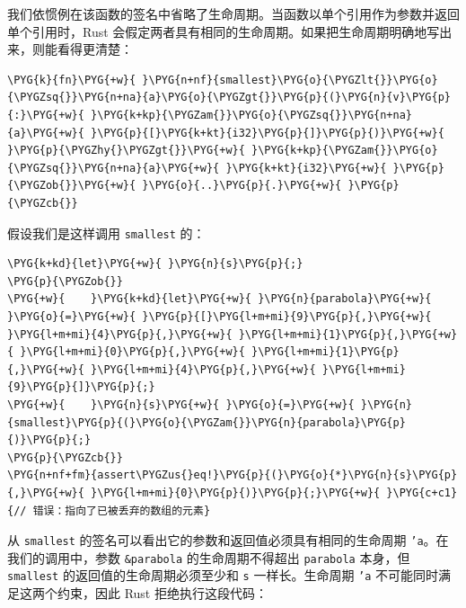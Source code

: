 我们依惯例在该函数的签名中省略了生命周期。当函数以单个引用作为参数并返回单个引用时，Rust 会假定两者具有相同的生命周期。如果把生命周期明确地写出来，则能看得更清楚：

\begin{Verbatim}[commandchars=\\\{\},breaklines=true,breakanywhere=true,fontsize=\codefont,xleftmargin=17bp]
\PYG{k}{fn}\PYG{+w}{ }\PYG{n+nf}{smallest}\PYG{o}{\PYGZlt{}}\PYG{o}{\PYGZsq{}}\PYG{n+na}{a}\PYG{o}{\PYGZgt{}}\PYG{p}{(}\PYG{n}{v}\PYG{p}{:}\PYG{+w}{ }\PYG{k+kp}{\PYGZam{}}\PYG{o}{\PYGZsq{}}\PYG{n+na}{a}\PYG{+w}{ }\PYG{p}{[}\PYG{k+kt}{i32}\PYG{p}{]}\PYG{p}{)}\PYG{+w}{ }\PYG{p}{\PYGZhy{}\PYGZgt{}}\PYG{+w}{ }\PYG{k+kp}{\PYGZam{}}\PYG{o}{\PYGZsq{}}\PYG{n+na}{a}\PYG{+w}{ }\PYG{k+kt}{i32}\PYG{+w}{ }\PYG{p}{\PYGZob{}}\PYG{+w}{ }\PYG{o}{..}\PYG{p}{.}\PYG{+w}{ }\PYG{p}{\PYGZcb{}}
\end{Verbatim}

假设我们是这样调用 \texttt{smallest} 的：

\begin{Verbatim}[commandchars=\\\{\},breaklines=true,breakanywhere=true,fontsize=\codefont,xleftmargin=17bp]
\PYG{k+kd}{let}\PYG{+w}{ }\PYG{n}{s}\PYG{p}{;}
\PYG{p}{\PYGZob{}}
\PYG{+w}{    }\PYG{k+kd}{let}\PYG{+w}{ }\PYG{n}{parabola}\PYG{+w}{ }\PYG{o}{=}\PYG{+w}{ }\PYG{p}{[}\PYG{l+m+mi}{9}\PYG{p}{,}\PYG{+w}{ }\PYG{l+m+mi}{4}\PYG{p}{,}\PYG{+w}{ }\PYG{l+m+mi}{1}\PYG{p}{,}\PYG{+w}{ }\PYG{l+m+mi}{0}\PYG{p}{,}\PYG{+w}{ }\PYG{l+m+mi}{1}\PYG{p}{,}\PYG{+w}{ }\PYG{l+m+mi}{4}\PYG{p}{,}\PYG{+w}{ }\PYG{l+m+mi}{9}\PYG{p}{]}\PYG{p}{;}
\PYG{+w}{    }\PYG{n}{s}\PYG{+w}{ }\PYG{o}{=}\PYG{+w}{ }\PYG{n}{smallest}\PYG{p}{(}\PYG{o}{\PYGZam{}}\PYG{n}{parabola}\PYG{p}{)}\PYG{p}{;}
\PYG{p}{\PYGZcb{}}
\PYG{n+nf+fm}{assert\PYGZus{}eq!}\PYG{p}{(}\PYG{o}{*}\PYG{n}{s}\PYG{p}{,}\PYG{+w}{ }\PYG{l+m+mi}{0}\PYG{p}{)}\PYG{p}{;}\PYG{+w}{ }\PYG{c+c1}{// 错误：指向了已被丢弃的数组的元素}
\end{Verbatim}

从 \texttt{smallest} 的签名可以看出它的参数和返回值必须具有相同的生命周期 \texttt{'a}。在我们的调用中，参数 \texttt{\&parabola} 的生命周期不得超出 \texttt{parabola} 本身，但 \texttt{smallest} 的返回值的生命周期必须至少和 \texttt{s} 一样长。生命周期 \texttt{'a} 不可能同时满足这两个约束，因此 Rust 拒绝执行这段代码：

